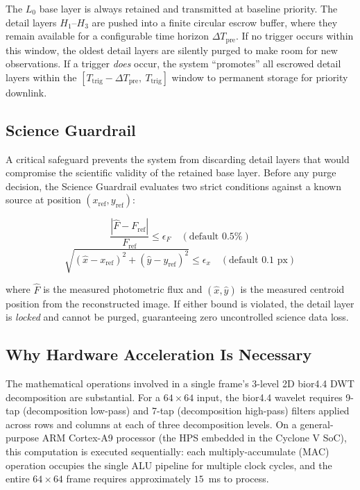 \documentclass[conference]{IEEEtran}
\begin{document}
The $L_0$ base layer is always retained and transmitted at baseline priority. The detail layers $H_1$--$H_3$ are pushed into a finite circular escrow buffer, where they remain available for a configurable time horizon $\Delta T_{\text{pre}}$. If no trigger occurs within this window, the oldest detail layers are silently purged to make room for new observations. If a trigger \textit{does} occur, the system ``promotes'' all escrowed detail layers within the $[T_{\text{trig}} - \Delta T_{\text{pre}},\ T_{\text{trig}}]$ window to permanent storage for priority downlink.

\subsection{Science Guardrail}

A critical safeguard prevents the system from discarding detail layers that would compromise the scientific validity of the retained base layer. Before any purge decision, the Science Guardrail evaluates two strict conditions against a known source at position $(x_{\text{ref}}, y_{\text{ref}})$:

\begin{equation}
    \frac{|\hat{F} - F_{\text{ref}}|}{F_{\text{ref}}} \leq \epsilon_F \quad (\text{default } 0.5\%)
    \label{eq:flux_guard}
\end{equation}
\begin{equation}
    \sqrt{(\hat{x} - x_{\text{ref}})^2 + (\hat{y} - y_{\text{ref}})^2} \leq \epsilon_x \quad (\text{default } 0.1 \text{ px})
    \label{eq:centroid_guard}
\end{equation}

where $\hat{F}$ is the measured photometric flux and $(\hat{x}, \hat{y})$ is the measured centroid position from the reconstructed image. If either bound is violated, the detail layer is \textit{locked} and cannot be purged, guaranteeing zero uncontrolled science data loss.

\subsection{Why Hardware Acceleration Is Necessary}

The mathematical operations involved in a single frame's 3-level 2D bior4.4 DWT decomposition are substantial. For a $64 \times 64$ input, the bior4.4 wavelet requires 9-tap (decomposition low-pass) and 7-tap (decomposition high-pass) filters applied across rows and columns at each of three decomposition levels. On a general-purpose ARM Cortex-A9 processor (the HPS embedded in the Cyclone V SoC), this computation is executed sequentially: each multiply-accumulate (MAC) operation occupies the single ALU pipeline for multiple clock cycles, and the entire $64 \times 64$ frame requires approximately $15$~ms to process.
\end{document}
